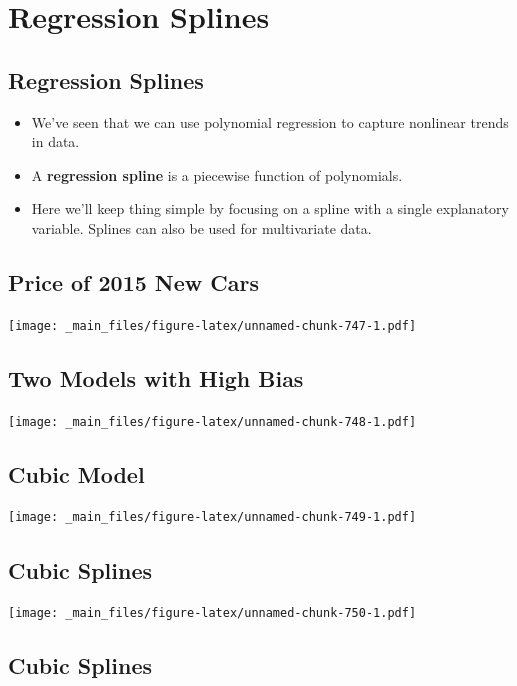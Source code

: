 \documentclass[]{book}
\begin{document}
\section{Regression Splines}\label{regression-splines}

\subsection{Regression Splines}\label{regression-splines-1}

\begin{itemize}
\item
  We've seen that we can use polynomial regression to capture nonlinear
  trends in data.
\item
  A \textbf{regression spline} is a piecewise function of polynomials.
\item
  Here we'll keep thing simple by focusing on a spline with a single
  explanatory variable. Splines can also be used for multivariate data.
\end{itemize}

\subsection{Price of 2015 New Cars}\label{price-of-2015-new-cars}

\texttt{[image: \_main\_files/figure-latex/unnamed-chunk-747-1.pdf]}

\subsection{Two Models with High Bias}\label{two-models-with-high-bias}

\texttt{[image: \_main\_files/figure-latex/unnamed-chunk-748-1.pdf]}

\subsection{Cubic Model}\label{cubic-model-2}

\texttt{[image: \_main\_files/figure-latex/unnamed-chunk-749-1.pdf]}

\subsection{Cubic Splines}\label{cubic-splines}

\texttt{[image: \_main\_files/figure-latex/unnamed-chunk-750-1.pdf]}

\subsection{Cubic Splines}\label{cubic-splines-1}
\end{document}

